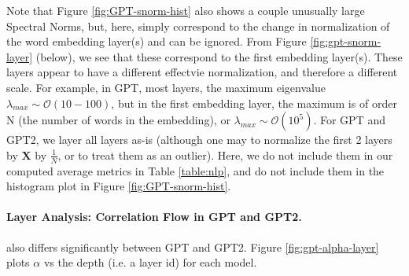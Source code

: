 Note that Figure \ref{fig:GPT-snorm-hist} also shows a couple unusually large Spectral Norms, but,
here, simply correspond to the change in normalization of the word embedding layer(s) and can be ignored.
From Figure \ref{fig:gpt-snorm-layer} (below), we see that these correspond to the first embedding layer(s).
These layers appear to have a different effectvie normalization, and therefore a different scale.
For example, in GPT, most layers, the maximum eigenvalue $\lambda_{max}\sim\mathcal{O}(10-100)$,
but in the first embedding layer, the maximum is of order N (the number of words in the embedding), or
 $\lambda_{max}\sim\mathcal{O}(10^{5})$.  For GPT and GPT2, we layer all layers as-is (although one may to normalize
the first 2 layers by  $\mathbf{X}$ by $\frac{1}{N}$, or to treat them as an outlier).
Here, we do not include them in our computed average metrics in Table \ref{table:nlp},
and do not include them in the histogram plot in Figure \ref{fig:GPT-snorm-hist}.

\paragraph{Layer Analysis: Correlation Flow in GPT and GPT2.} 

also differs significantly between GPT and GPT2.
Figure \ref{fig:gpt-alpha-layer} plots $\alpha$ vs the depth (i.e. a layer id) for each model.


